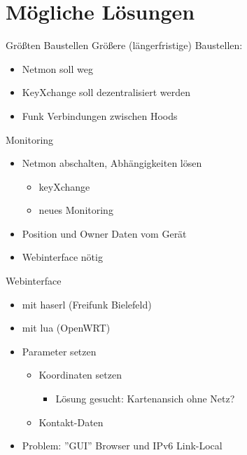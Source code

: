 \section{Mögliche Lösungen}

\begin{frame}{Größten Baustellen}
    Größere (längerfristige) Baustellen:
    \begin{itemize}
        \item Netmon soll weg
        \item KeyXchange soll dezentralisiert werden
        \item Funk Verbindungen zwischen Hoods
    \end{itemize}
\end{frame}

\begin{frame}{Monitoring}
    \begin{itemize}
        \item Netmon abschalten, Abhängigkeiten lösen
        \begin{itemize}
            \item keyXchange
            \item neues Monitoring
        \end{itemize}
        \item Position und Owner Daten vom Gerät
        \item Webinterface nötig
    \end{itemize}
\end{frame}

\begin{frame}{Webinterface}
    \begin{itemize}
        \item \zb{} mit haserl (Freifunk Bielefeld)
        \item \zb{} mit lua (OpenWRT)
        \item Parameter setzen
        \begin{itemize}
            \item Koordinaten setzen
                \begin{itemize}
                    \item Lösung gesucht: Kartenansich ohne Netz?
                \end{itemize}
            \item Kontakt-Daten
        \end{itemize}
        \item Problem: ''GUI'' Browser und IPv6 Link-Local
    \end{itemize}
\end{frame}

